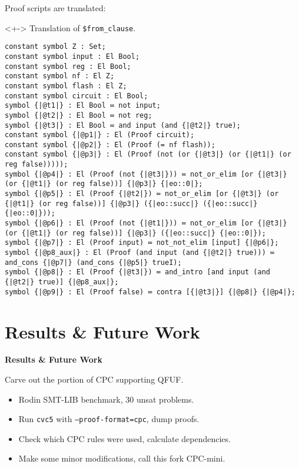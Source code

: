 \documentclass[lualatex, compress, 12pt, handout]{beamer}
\begin{document}
\begin{frame}[fragile]
	Proof scripts are translated:\\[2mm]
	\begin{uncoverenv}<+->%
		\exxample Translation of \texttt{\$from\_clause}.
		\begin{lstlisting}[basicstyle=\ttfamily\tiny]
constant symbol Z : Set;
constant symbol input : El Bool;
constant symbol reg : El Bool;
constant symbol nf : El Z;
constant symbol flash : El Z;
constant symbol circuit : El Bool;
symbol {|@t1|} : El Bool ≔ not input;
symbol {|@t2|} : El Bool ≔ not reg;
symbol {|@t3|} : El Bool ≔ and input (and {|@t2|} true);
constant symbol {|@p1|} : El (Proof circuit);
constant symbol {|@p2|} : El (Proof (= nf flash));
constant symbol {|@p3|} : El (Proof (not (or {|@t3|} (or {|@t1|} (or reg false)))));
symbol {|@p4|} : El (Proof (not {|@t3|})) ≔ not_or_elim [or {|@t3|} (or {|@t1|} (or reg false))] {|@p3|} {|eo::0|};
symbol {|@p5|} : El (Proof {|@t2|}) ≔ not_or_elim [or {|@t3|} (or {|@t1|} (or reg false))] {|@p3|} ({|eo::succ|} ({|eo::succ|} {|eo::0|}));
symbol {|@p6|} : El (Proof (not {|@t1|})) ≔ not_or_elim [or {|@t3|} (or {|@t1|} (or reg false))] {|@p3|} ({|eo::succ|} {|eo::0|});
symbol {|@p7|} : El (Proof input) ≔ not_not_elim [input] {|@p6|};
symbol {|@p8_aux|} : El (Proof (and input (and {|@t2|} true))) ≔ and_cons {|@p7|} (and_cons {|@p5|} trueI);
symbol {|@p8|} : El (Proof {|@t3|}) ≔ and_intro [and input (and {|@t2|} true)] {|@p8_aux|};
symbol {|@p9|} : El (Proof false) ≔ contra [{|@t3|}] {|@p8|} {|@p4|};\end{lstlisting}
	\end{uncoverenv}
\end{frame}

\section{Results \& Future Work}


\begin{frame}[standout]
	\centering\Huge
	\textbf{Results \& Future Work}
\end{frame}

\begin{frame}
	Carve out the portion of CPC supporting \alert{QFUF}.
	\begin{itemize}
		\item<+-> \alert{Rodin} SMT-LIB benchmark, 30 unsat problems.
		\item<+-> Run \texttt{cvc5} with \texttt{--proof-format=cpc}, dump proofs.
		\item<+-> Check which CPC rules were used, calculate dependencies.
		\item<+-> Make some minor modifications, call this fork \alert{CPC-mini}.
	\end{itemize}
\end{frame}
\end{document}

